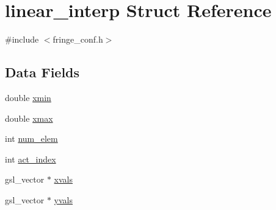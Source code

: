 \hypertarget{structlinear__interp}{
\section{linear\_\-interp Struct Reference}
\label{structlinear__interp}
}


{\ttfamily \#include $<$fringe\_\-conf.h$>$}\subsection*{Data Fields}
\begin{DoxyCompactItemize}
\item 
double \hyperlink{structlinear__interp_ae596d0ba2cbacf04e8ca8ec4b2b12999}{xmin}
\item 
double \hyperlink{structlinear__interp_a07c70a028df86af8bd56afed39e34bc3}{xmax}
\item 
int \hyperlink{structlinear__interp_a94df950dc3206eaa7e8455ded90f3052}{num\_\-elem}
\item 
int \hyperlink{structlinear__interp_a188bb88ba290596ef94628b0f5a684ba}{act\_\-index}
\item 
gsl\_\-vector $\ast$ \hyperlink{structlinear__interp_afda3a38e339f779b46246d52f1605a65}{xvals}
\item 
gsl\_\-vector $\ast$ \hyperlink{structlinear__interp_a5f5e240a2f31547ed083b1013b5da850}{yvals}
\end{DoxyCompactItemize}


